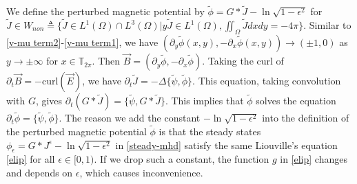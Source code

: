 \documentclass[1 [leqno, 11pt]{amsart}
\numberwithin{equation}{section}
\let\ep=\epsilon
\begin{document}
\begin{CJK*}{GBK}{song}
We  define the perturbed  magnetic potential by $\tilde \phi
=G*\tilde J-\ln\sqrt{1-\epsilon^2}$ for $\tilde J\in
W_{non}\triangleq \{ \tilde J \in L^1(\Omega)\cap L^3(\Omega)|
  y\tilde J\in L^1(\Omega),\iint_{\Omega}\tilde J dxdy=-4\pi\}.$ Similar to
  \eqref{v-mu term2}-\eqref{v-mu term1}, we have $(\partial_y\tilde \phi(x,y),-\partial_x\tilde \phi(x,y))\to (\pm1,0)$ as $y\to\pm\infty$ for $x\in\mathbb{T}_{2\pi}$. Then $\vec{B}=(\partial_y\tilde \phi,-\partial_x\tilde \phi)$.
Taking the curl of $\partial_t\vec{B}=-\text{curl}(\vec{E})$, we have $\partial_t\tilde J=-\Delta\{\tilde \psi,\tilde \phi\}$. This equation, taking convolution with $G$, gives $\partial_t(G*\tilde J)=\{\tilde \psi,G*\tilde J\}$. This implies that $\tilde \phi$ solves the equation $\partial_t\tilde \phi=\{\tilde \psi,\tilde \phi\}$.
The reason we add the constant $-\ln\sqrt{1-\epsilon^2}$ into the definition of  the perturbed  magnetic potential $\tilde \phi$ is that
 the steady states $
\phi_{\ep}=G*J^{\ep}-\ln\sqrt{1-\epsilon^2}$ in \eqref{steady-mhd} satisfy the same Liouville's equation \eqref{elip} for all $\ep\in[0,1)$. If we drop such a  constant, the function $g$ in \eqref{elip} changes and depends on $\ep$, which causes inconvenience.



\end{CJK*}
\end{document}
